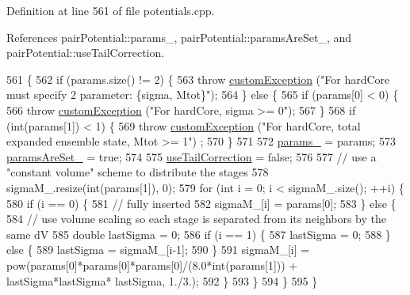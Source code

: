 Definition at line 561 of file potentials.\-cpp.



References pair\-Potential\-::params\-\_\-, pair\-Potential\-::params\-Are\-Set\-\_\-, and pair\-Potential\-::use\-Tail\-Correction.


\begin{DoxyCode}
561                                                                \{
562     \textcolor{keywordflow}{if} (params.size() != 2) \{
563         \textcolor{keywordflow}{throw} \hyperlink{classcustom_exception}{customException} (\textcolor{stringliteral}{"For hardCore must specify 2 parameter: \{sigma, Mtot\}"});
564     \} \textcolor{keywordflow}{else} \{
565         \textcolor{keywordflow}{if} (params[0] < 0) \{
566             \textcolor{keywordflow}{throw} \hyperlink{classcustom_exception}{customException} (\textcolor{stringliteral}{"For hardCore, sigma >= 0"});
567         \}
568         \textcolor{keywordflow}{if} (\textcolor{keywordtype}{int}(params[1]) < 1) \{
569             \textcolor{keywordflow}{throw} \hyperlink{classcustom_exception}{customException} (\textcolor{stringliteral}{"For hardCore, total expanded ensemble state, Mtot >= 1"})
      ;
570         \}
571 
572         \hyperlink{classpair_potential_abf8ec8af983d6e9960bd149da099e883}{params\_} = params;
573         \hyperlink{classpair_potential_a635755c0a952bfc05a4cfae230c3dbd2}{paramsAreSet\_} = \textcolor{keyword}{true};
574 
575         \hyperlink{classpair_potential_ab4b4538a7e13771f50a29aaac2443037}{useTailCorrection} = \textcolor{keyword}{false};
576 
577         \textcolor{comment}{// use a "constant volume" scheme to distribute the stages}
578         sigmaM\_.resize(\textcolor{keywordtype}{int}(params[1]), 0);
579         \textcolor{keywordflow}{for} (\textcolor{keywordtype}{int} i = 0; i < sigmaM\_.size(); ++i) \{
580             \textcolor{keywordflow}{if} (i == 0) \{
581                 \textcolor{comment}{// fully inserted}
582                 sigmaM\_[i] = params[0];
583             \} \textcolor{keywordflow}{else} \{
584                 \textcolor{comment}{// use volume scaling so each stage is separated from its neighbors by the same dV}
585                 \textcolor{keywordtype}{double} lastSigma = 0;
586                 \textcolor{keywordflow}{if} (i == 1) \{
587                     lastSigma = 0;
588                 \} \textcolor{keywordflow}{else} \{
589                     lastSigma = sigmaM\_[i-1];
590                 \}
591                 sigmaM\_[i] = pow(params[0]*params[0]*params[0]/(8.0*\textcolor{keywordtype}{int}(params[1])) + lastSigma*lastSigma*
      lastSigma, 1./3.);
592             \}
593         \}
594     \}
595 \}
\end{DoxyCode}
